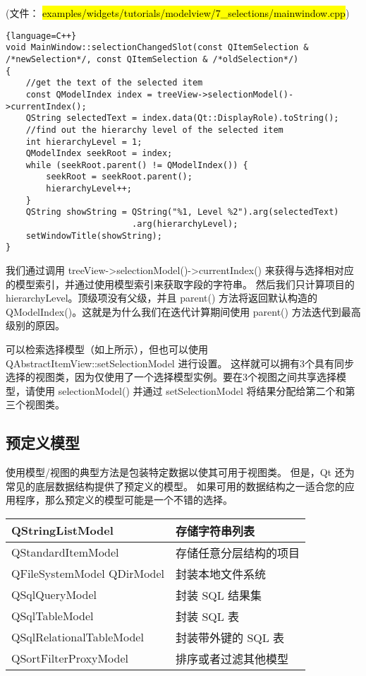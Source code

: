 (文件： \hl{examples/widgets/tutorials/modelview/7\_selections/mainwindow.cpp})

\begin{lstlisting}{language=C++}
void MainWindow::selectionChangedSlot(const QItemSelection & /*newSelection*/, const QItemSelection & /*oldSelection*/)
{
    //get the text of the selected item
    const QModelIndex index = treeView->selectionModel()->currentIndex();
    QString selectedText = index.data(Qt::DisplayRole).toString();
    //find out the hierarchy level of the selected item
    int hierarchyLevel = 1;
    QModelIndex seekRoot = index;
    while (seekRoot.parent() != QModelIndex()) {
        seekRoot = seekRoot.parent();
        hierarchyLevel++;
    }
    QString showString = QString("%1, Level %2").arg(selectedText)
                         .arg(hierarchyLevel);
    setWindowTitle(showString);
}
\end{lstlisting}

我们通过调用 treeView->selectionModel()->currentIndex() 来获得与选择相对应的模型索引，并通过使用模型索引来获取字段的字符串。
然后我们只计算项目的hierarchyLevel。顶级项没有父级，并且 parent() 方法将返回默认构造的 QModelIndex()。这就是为什么我们在迭代计算期间使用 parent() 方法迭代到最高级别的原因。

可以检索选择模型（如上所示），但也可以使用 QAbstractItemView::setSelectionModel 进行设置。
这样就可以拥有3个具有同步选择的视图类，因为仅使用了一个选择模型实例。要在3个视图之间共享选择模型，请使用 selectionModel() 并通过 setSelectionModel 将结果分配给第二个和第三个视图类。

\subsection{预定义模型}

使用模型/视图的典型方法是包装特定数据以使其可用于视图类。
但是，Qt 还为常见的底层数据结构提供了预定义的模型。
如果可用的数据结构之一适合您的应用程序，那么预定义的模型可能是一个不错的选择。

\begin{longtable}{|l|l|}
\hline
QStringListModel &	存储字符串列表 \\ 
\hline
QStandardItemModel &	存储任意分层结构的项目\\
\hline
QFileSystemModel
QDirModel	 & 封装本地文件系统\\ 
\hline
QSqlQueryModel &	封装 SQL 结果集\\
\hline
QSqlTableModel	& 封装 SQL 表\\
\hline
QSqlRelationalTableModel &	封装带外键的 SQL 表 \\
\hline
QSortFilterProxyModel	& 排序或者过滤其他模型 \\
\hline
\end{longtable}


